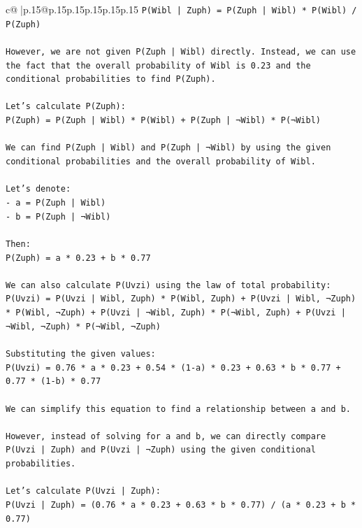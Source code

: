 \documentclass{article}
\begin{document}
{\begin{supertabular}{c@{$\;$}|p{.15\linewidth}@{}p{.15\linewidth}p{.15\linewidth}p{.15\linewidth}p{.15\linewidth}p{.15\linewidth}}
{{{\texttt{P(Wibl | Zuph) = P(Zuph | Wibl) * P(Wibl) / P(Zuph)} \\
\\ 
\texttt{However, we are not given P(Zuph | Wibl) directly. Instead, we can use the fact that the overall probability of Wibl is 0.23 and the conditional probabilities to find P(Zuph).} \\
\\ 
\texttt{Let's calculate P(Zuph):} \\
\texttt{P(Zuph) = P(Zuph | Wibl) * P(Wibl) + P(Zuph | ¬Wibl) * P(¬Wibl)} \\
\\ 
\texttt{We can find P(Zuph | Wibl) and P(Zuph | ¬Wibl) by using the given conditional probabilities and the overall probability of Wibl.} \\
\\ 
\texttt{Let's denote:} \\
\texttt{{-} a = P(Zuph | Wibl)} \\
\texttt{{-} b = P(Zuph | ¬Wibl)} \\
\\ 
\texttt{Then:} \\
\texttt{P(Zuph) = a * 0.23 + b * 0.77} \\
\\ 
\texttt{We can also calculate P(Uvzi) using the law of total probability:} \\
\texttt{P(Uvzi) = P(Uvzi | Wibl, Zuph) * P(Wibl, Zuph) + P(Uvzi | Wibl, ¬Zuph) * P(Wibl, ¬Zuph) + P(Uvzi | ¬Wibl, Zuph) * P(¬Wibl, Zuph) + P(Uvzi | ¬Wibl, ¬Zuph) * P(¬Wibl, ¬Zuph)} \\
\\ 
\texttt{Substituting the given values:} \\
\texttt{P(Uvzi) = 0.76 * a * 0.23 + 0.54 * (1{-}a) * 0.23 + 0.63 * b * 0.77 + 0.77 * (1{-}b) * 0.77} \\
\\ 
\texttt{We can simplify this equation to find a relationship between a and b.} \\
\\ 
\texttt{However, instead of solving for a and b, we can directly compare P(Uvzi | Zuph) and P(Uvzi | ¬Zuph) using the given conditional probabilities.} \\
\\ 
\texttt{Let's calculate P(Uvzi | Zuph):} \\
\texttt{P(Uvzi | Zuph) = (0.76 * a * 0.23 + 0.63 * b * 0.77) / (a * 0.23 + b * 0.77)} \\
}}}
\end{supertabular}}
\end{document}
